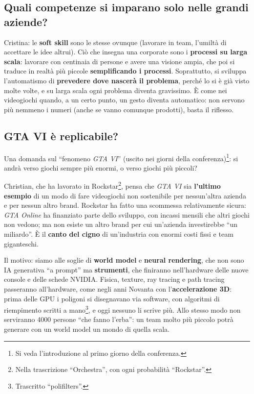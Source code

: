\subsection{Quali competenze si imparano solo nelle grandi aziende?}

Cristina: le \textbf{soft skill} sono le stesse ovunque (lavorare in team, l'umiltà
di accettare le idee altrui). Ciò che insegna una corporate sono i \textbf{processi su
larga scala}: lavorare con centinaia di persone e avere una visione ampia, che poi si
traduce in realtà più piccole \textbf{semplificando i processi}. Soprattutto, si
sviluppa l'automatismo di \textbf{prevedere dove nascerà il problema}, perché lo si
è già visto molte volte, e su larga scala ogni problema diventa gravissimo. È come
nei videogiochi quando, a un certo punto, un gesto diventa automatico: non servono
più nemmeno i numeri (anche se vanno comunque prodotti), basta il riflesso.

\subsection{GTA VI è replicabile?}

Una domanda sul ``fenomeno \emph{GTA VI}'' (uscito nei giorni della
conferenza)\footnote{Si veda l'introduzione al primo giorno della conferenza.}: si
andrà verso giochi sempre più enormi, o verso giochi più piccoli?

Christian, che ha lavorato in Rockstar\footnote{Nella trascrizione ``Orchestra'',
con ogni probabilità ``Rockstar''.}, pensa che \emph{GTA VI} sia
\textbf{l'ultimo esempio} di un modo di fare videogiochi non sostenibile per
nessun'altra azienda e per nessun altro brand. Rockstar ha fatto una scommessa
relativamente sicura: \emph{GTA Online} ha finanziato parte dello sviluppo, con
incassi mensili che altri giochi non vedono; ma non esiste un altro brand per cui
un'azienda investirebbe ``un miliardo''. È il \textbf{canto del cigno} di
un'industria con enormi costi fissi e team giganteschi.

Il motivo: siamo alle soglie di \textbf{world model} e \textbf{neural rendering}, che
non sono IA generativa ``a prompt'' ma \textbf{strumenti}, che finiranno
nell'hardware delle nuove console e delle schede NVIDIA. Fisica, texture, ray
tracing e path tracing passeranno all'hardware, come negli anni Novanta con
l'\textbf{accelerazione 3D}: prima delle GPU i poligoni si disegnavano via software,
con algoritmi di riempimento scritti a mano\footnote{Trascritto
``polifilters''.}, e oggi nessuno li scrive più. Allo stesso modo non serviranno
4000 persone ``che fanno l'erba'': un team molto più piccolo potrà generare con un
world model un mondo di quella scala.

